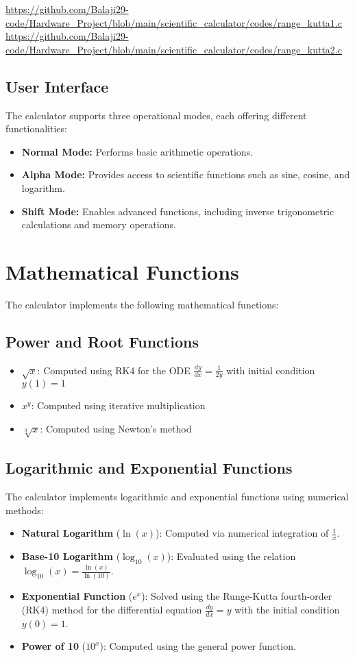 \documentclass[12pt,a4paper]{article}
\begin{document}
\url{https://github.com/Balaji29-code/Hardware_Project/blob/main/scientific_calculator/codes/range_kutta1.c} \\

\url{https://github.com/Balaji29-code/Hardware_Project/blob/main/scientific_calculator/codes/range_kutta2.c}

\subsection{User Interface}
The calculator supports three operational modes, each offering different functionalities:  
\begin{itemize}
    \item \textbf{Normal Mode:} Performs basic arithmetic operations.  
    \item \textbf{Alpha Mode:} Provides access to scientific functions such as sine, cosine, and logarithm.  
    \item \textbf{Shift Mode:} Enables advanced functions, including inverse trigonometric calculations and memory operations.  
\end{itemize}

\section{Mathematical Functions}
The calculator implements the following mathematical functions:

\subsection{Power and Root Functions}
\begin{itemize}
    \item $\sqrt{x}$: Computed using RK4 for the ODE $\frac{dy}{dx} = \frac{1}{2y}$ with initial condition $y(1) = 1$
    \item $x^y$: Computed using iterative multiplication
    \item $\sqrt[3]{x}$: Computed using Newton's method
\end{itemize}


\subsection{Logarithmic and Exponential Functions}  
The calculator implements logarithmic and exponential functions using numerical methods:  
\begin{itemize}  
    \item \textbf{Natural Logarithm} ($\ln(x)$): Computed via numerical integration of $\frac{1}{x}$.  
    \item \textbf{Base-10 Logarithm} ($\log_{10}(x)$): Evaluated using the relation $\log_{10}(x) = \frac{\ln(x)}{\ln(10)}$.  
    \item \textbf{Exponential Function} ($e^x$): Solved using the Runge-Kutta fourth-order (RK4) method for the differential equation $\frac{dy}{dx} = y$ with the initial condition $y(0) = 1$.  
    \item \textbf{Power of 10} ($10^x$): Computed using the general power function.  
\end{itemize}  
\end{document}
